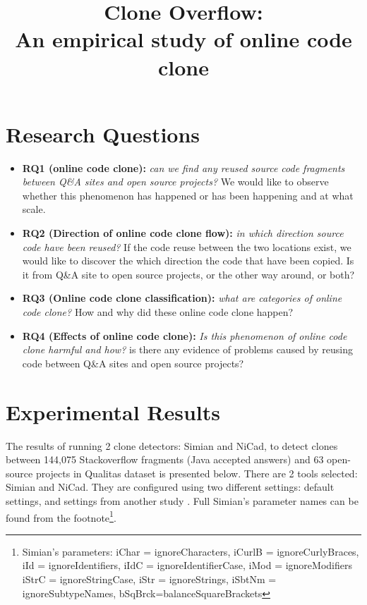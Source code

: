 \documentclass{IEEEtran}
\begin{document}
\onecolumn

\title{Clone Overflow: \\
	An empirical study of online code clone}
\maketitle

\section*{Research Questions}
\begin{itemize}
	\item \textbf{RQ1 (online code clone):} \textit{can we find any reused source code fragments between Q\&A sites and open source projects?} We would like to observe whether this phenomenon has happened or has been happening and at what scale.
	\item \textbf{RQ2 (Direction of online code clone flow):} \textit{in which direction source code have been reused?} If the code reuse between the two locations exist, we would like to discover the which direction the code that have been copied. Is it from Q\&A site to open source projects, or the other way around, or both?
	\item \textbf{RQ3 (Online code clone classification):} \textit{what are categories of online code clone?} How and why did these online code clone happen?
	\item \textbf{RQ4 (Effects of online code clone):} \textit{ Is this phenomenon of online code clone harmful and how?} is there any evidence of problems caused by reusing code between Q\&A sites and open source projects?
\end{itemize}

\section*{Experimental Results}
The results of running 2 clone detectors: Simian and NiCad, to detect clones between 144,075 Stackoverflow fragments (Java accepted answers) and 63 open-source projects in Qualitas dataset is presented below. There are 2 tools selected: Simian and NiCad. They are configured using two different settings: default settings, and settings from another study \cite{Wang2013}. Full Simian's parameter names can be found from the footnote\footnote{Simian's parameters: iChar = ignoreCharacters, iCurlB = ignoreCurlyBraces, iId = ignoreIdentifiers, iIdC = ignoreIdentifierCase, iMod = ignoreModifiers \newline iStrC = ignoreStringCase, iStr = ignoreStrings, iSbtNm = ignoreSubtypeNames, bSqBrck=balanceSquareBrackets}. 
\end{document}
